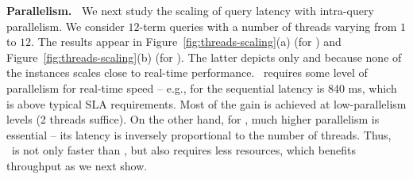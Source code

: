 {\bf Parallelism.\ } 
We next study the scaling of query latency with  intra-query parallelism. We consider  $12$-term queries with a number of threads varying from $1$ to $12$. 
The results appear in Figure~\ref{fig:threads-scaling}(a) (for \cw) and Figure~\ref{fig:threads-scaling}(b) (for \cwten). The latter depicts only \alg\/ and \pRA\/ 
because none of the \pBMW\/ instances scales close to real-time performance.  \alg\ requires some level of parallelism for real-time speed -- e.g., for \cw\/ the sequential
latency is $840$ ms, which is  above typical SLA requirements. Most of the gain is achieved at low-parallelism levels (2 threads suffice). 
On the other hand, for \pBMW, much higher parallelism is essential -- its latency is inversely proportional to the number of threads. Thus, \alg\ is not only faster 
than \pBMW, but also requires less resources, which benefits throughput as we next show.

